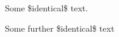 \documentclass{article}
\begin{document}
Some \$identical\$ text.

Some further \$identical\$ text
\end{document}
